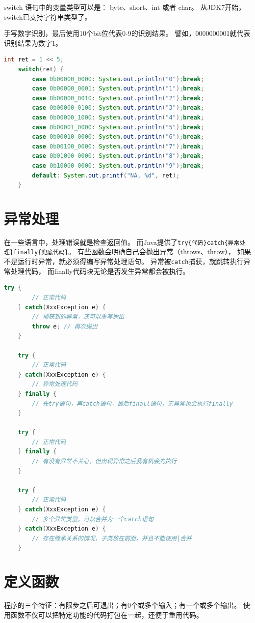 \noindent
switch 语句中的变量类型可以是： byte、short、int 或者 char。
从JDK7开始，switch已支持字符串类型了。
\bigskip
{}
\bigskip

\begin{example}
	手写数字识别，最后使用10个bit位代表0-9的识别结果。
	譬如，0000000001就代表识别结果为数字1。
\end{example}

\begin{lstlisting}[language=Java]
	int ret = 1 << 5;
	switch(ret) {
		case 0b00000_0000: System.out.println("0");break;
		case 0b00000_0001: System.out.println("1");break;
		case 0b00000_0010: System.out.println("2");break;
		case 0b00000_0100: System.out.println("3");break;
		case 0b00000_1000: System.out.println("4");break;
		case 0b00001_0000: System.out.println("5");break;
		case 0b00010_0000: System.out.println("6");break;
		case 0b00100_0000: System.out.println("7");break;
		case 0b01000_0000: System.out.println("8");break;
		case 0b10000_0000: System.out.println("9");break;
		default: System.out.printf("NA, %d", ret);
	}
\end{lstlisting}

\section{异常处理}
在一些语言中，处理错误就是检查返回值。
而Java提供了\lstinline!try{代码}catch{异常处理}finally{兜底代码}!。
有些函数会明确自己会抛出异常（throws、throw），
如果不是运行时异常，就必须得编写异常处理语句。
异常被\lstinline{catch}捕获，就跳转执行异常处理代码，
而finally代码块无论是否发生异常都会被执行。
\medskip
\begin{lstlisting}[language=Java]
	try {
		// 正常代码
	} catch(XxxException e) { 
		// 捕获到的异常，还可以重写抛出
		throw e; // 再次抛出
	}
 
	try {
		// 正常代码
	} catch(XxxException e) {
		// 异常处理代码
	} finally { 
		// 先try语句，再catch语句，最后finall语句，无异常也会执行finally
	}
 
	try {
		// 正常代码
	} finally { 
		// 有没有异常不关心，但出现异常之后我有机会先执行
	}
 
	try {
		// 正常代码
	} catch(XxxException e) { 
		// 多个异常类型，可以合并为一个catch语句
	} catch(XxxException e) { 
		// 存在继承关系的情况，子类放在前面，并且不能使用|合并
	}
 \end{lstlisting}

\section{定义函数}
程序的三个特征：有限步之后可退出；有0个或多个输入；有一个或多个输出。
使用函数不仅可以把特定功能的代码打包在一起，还便于重用代码。

